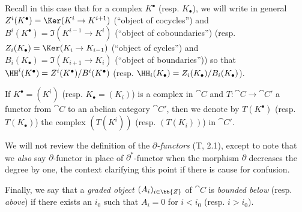 \begin{env}[11.2.1]
Recall in this case that for a complex $K^\bullet$ (resp. $K_\bullet$), we will write in general $Z^i(K^\bullet)=\Ker(K^i\to K^{i+1})$ (``object of cocycles'') and $B^i(K^\bullet)=\Im(K^{i-1}\to K^i)$ (``object of coboundaries'') (resp. $Z_i(K_\bullet)=\Ker(K_i\to K_{i-1})$ (``object of cycles'') and $B_i(K_\bullet)=\Im(K_{i+1}\to K_i)$ (``object of boundaries'')) so that $\HH^i(K^\bullet)=Z^i(K^\bullet)/B^i(K^\bullet)$ (resp. $\HH_i(K_\bullet)=Z_i(K_\bullet)/B_i(K_\bullet)$).

If $K^\bullet=(K^i)$ (resp. $K_\bullet=(K_i)$) is a complex in $\cat{C}$ and $T:\cat{C}\to\cat{C}'$ a functor from $\cat{C}$ to an abelian category $\cat{C}'$, then we denote by $T(K^\bullet)$ (resp. $T(K_\bullet)$) the complex $(T(K^i))$ (resp. $(T(K_i))$) in $\cat{C}'$.

We will not review the definition of the \emph{$\partial$-functors} (T, 2.1), except to note that we \emph{also} say $\partial$-functor in place of $\partial^*$-functor when the morphism $\partial$ decreases the degree by one, the context clarifying this point if there is cause for confusion.

Finally, we say that a \emph{graded object $(A_i)_{i\in\bb{Z}}$} of $\cat{C}$ is \emph{bounded below} (resp. \emph{above}) if there exists an $i_0$ such that $A_i=0$ for $i<i_0$ (resp. $i>i_0$).
\end{env}

